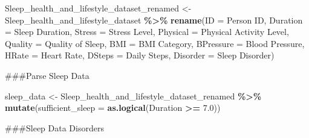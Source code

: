 \documentclass[
  11pt,
]{article}
\newenvironment{Shaded}{\begin{snugshade}}{\end{snugshade}}
\newcommand{\AttributeTok}[1]{\textcolor[rgb]{0.13,0.29,0.53}{#1}}
\newcommand{\FloatTok}[1]{\textcolor[rgb]{0.00,0.00,0.81}{#1}}
\newcommand{\FunctionTok}[1]{\textcolor[rgb]{0.13,0.29,0.53}{\textbf{#1}}}
\newcommand{\NormalTok}[1]{#1}
\newcommand{\OtherTok}[1]{\textcolor[rgb]{0.56,0.35,0.01}{#1}}
\newcommand{\SpecialCharTok}[1]{\textcolor[rgb]{0.81,0.36,0.00}{\textbf{#1}}}
\newcommand{\StringTok}[1]{\textcolor[rgb]{0.31,0.60,0.02}{#1}}
\begin{document}
\begin{Shaded}
\begin{Highlighting}[]
\NormalTok{Sleep\_health\_and\_lifestyle\_dataset\_renamed }\OtherTok{\textless{}{-}}\NormalTok{ Sleep\_health\_and\_lifestyle\_dataset }\SpecialCharTok{\%\textgreater{}\%}
  \FunctionTok{rename}\NormalTok{(}\AttributeTok{ID =} \StringTok{\textquotesingle{}Person ID\textquotesingle{}}\NormalTok{,}
         \AttributeTok{Duration =} \StringTok{\textquotesingle{}Sleep Duration\textquotesingle{}}\NormalTok{,}
         \AttributeTok{Stress =} \StringTok{\textquotesingle{}Stress Level\textquotesingle{}}\NormalTok{,}
         \AttributeTok{Physical =} \StringTok{\textquotesingle{}Physical Activity Level\textquotesingle{}}\NormalTok{,}
         \AttributeTok{Quality =} \StringTok{\textquotesingle{}Quality of Sleep\textquotesingle{}}\NormalTok{,}
         \AttributeTok{BMI =} \StringTok{\textquotesingle{}BMI Category\textquotesingle{}}\NormalTok{,}
         \AttributeTok{BPressure =} \StringTok{\textquotesingle{}Blood Pressure\textquotesingle{}}\NormalTok{,}
         \AttributeTok{HRate =} \StringTok{\textquotesingle{}Heart Rate\textquotesingle{}}\NormalTok{,}
         \AttributeTok{DSteps =} \StringTok{\textquotesingle{}Daily Steps\textquotesingle{}}\NormalTok{,}
         \AttributeTok{Disorder =} \StringTok{\textquotesingle{}Sleep Disorder\textquotesingle{}}\NormalTok{)}
\end{Highlighting}
\end{Shaded}

\#\#\#Parse Sleep Data

\begin{Shaded}
\begin{Highlighting}[]
\NormalTok{sleep\_data }\OtherTok{\textless{}{-}}\NormalTok{ Sleep\_health\_and\_lifestyle\_dataset\_renamed }\SpecialCharTok{\%\textgreater{}\%}
    \FunctionTok{mutate}\NormalTok{(}\AttributeTok{sufficient\_sleep =} \FunctionTok{as.logical}\NormalTok{(Duration }\SpecialCharTok{\textgreater{}=} \FloatTok{7.0}\NormalTok{))}
\end{Highlighting}
\end{Shaded}

\#\#\#Sleep Data Disorders
\end{document}
